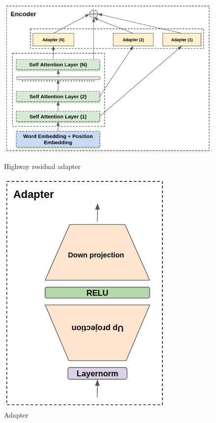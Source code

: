 \documentclass[12pt,a4paper,twoside]{report}
\theoremstyle{definition}
\begin{document}
\begin{figure}[h!]
\parbox{.45\linewidth}{
\begin{center}
\includegraphics[scale=0.45]{highway_residual}
\caption{Highway residual adapter}
\label{fig:highwayres}
\end{center}
}
\hfill
\parbox{.45\linewidth}{
\begin{center}
\includegraphics[scale=0.45]{adapter}
\caption{Adapter}
\label{fig:adapter}
\end{center}}
\end{figure}
\end{document}
